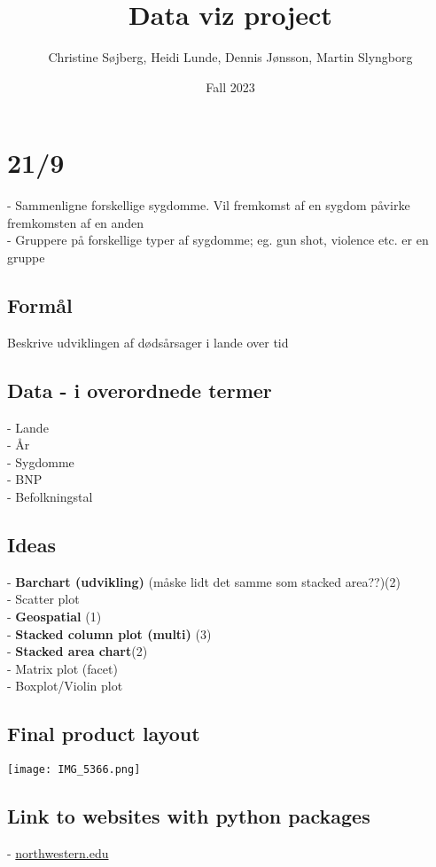 \documentclass{article}
\title{Data viz project}
\author{Christine Søjberg, Heidi Lunde, Dennis Jønsson, Martin Slyngborg}
\date{Fall 2023}
\begin{document}
  
\maketitle

\section*{21/9}
- Sammenligne forskellige sygdomme. Vil fremkomst af en sygdom påvirke fremkomsten af en anden\\
- Gruppere på forskellige typer af sygdomme; eg. gun shot, violence etc. er en gruppe \\
\subsection*{Formål}
Beskrive udviklingen af dødsårsager i lande over tid

\subsection*{Data - i overordnede termer}
- Lande\\
- År\\
- Sygdomme\\
- BNP\\
- Befolkningstal\\
\subsection*{Ideas}
- \textbf{Barchart (udvikling)} (måske lidt det samme som stacked area??)(2)\\
- Scatter plot\\
- \textbf{Geospatial} (1)\\
- \textbf{Stacked column plot (multi)} (3)\\
- \textbf{Stacked area chart}(2) \\
- Matrix plot (facet)\\
- Boxplot/Violin plot\\

\subsection*{Final product layout}
\texttt{[image: IMG\_5366.png]}

\newpage
\subsection*{Link to websites with python packages}
- \href{https://sites.northwestern.edu/researchcomputing/2022/02/03/what-is-the-best-interactive-plotting-package-in-python/}{northwestern.edu}\\
\end{document}
